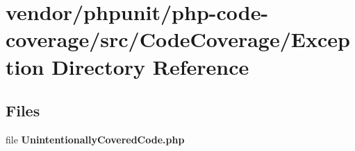 \section{vendor/phpunit/php-\/code-\/coverage/src/\+Code\+Coverage/\+Exception Directory Reference}
\label{dir_990c55302f0b889797d015275fb6cb08}
\subsection*{Files}
\begin{DoxyCompactItemize}
\item 
file {\bf Unintentionally\+Covered\+Code.\+php}
\end{DoxyCompactItemize}
